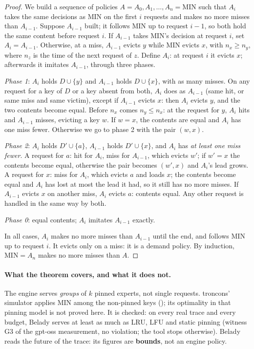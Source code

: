\begin{proof}
We build a sequence of policies $A = A_0, A_1, \ldots, A_n = \mathrm{MIN}$ such that $A_i$ takes the same decisions as MIN on the first $i$ requests and makes no more misses than $A_{i-1}$. Suppose $A_{i-1}$ built; it follows MIN up to request $i-1$, so both hold the same content before request $i$. If $A_{i-1}$ takes MIN's decision at request $i$, set $A_i = A_{i-1}$. Otherwise, at a miss, $A_{i-1}$ evicts $y$ while MIN evicts $x$, with $n_x \ge n_y$, where $n_z$ is the time of the next request of $z$. Define $A_i$: at request $i$ it evicts $x$; afterwards it imitates $A_{i-1}$, through three phases.

\emph{Phase 1}: $A_i$ holds $D \cup \{y\}$ and $A_{i-1}$ holds $D \cup \{x\}$, with as many misses. On any request for a key of $D$ or a key absent from both, $A_i$ does as $A_{i-1}$ (same hit, or same miss and same victim), except if $A_{i-1}$ evicts $x$: then $A_i$ evicts $y$, and the two contents become equal. Before $n_x$ comes $n_y \le n_x$: at the request for $y$, $A_i$ hits and $A_{i-1}$ misses, evicting a key $w$. If $w = x$, the contents are equal and $A_i$ has one miss fewer. Otherwise we go to phase 2 with the pair $(w, x)$.

\emph{Phase 2}: $A_i$ holds $D' \cup \{a\}$, $A_{i-1}$ holds $D' \cup \{x\}$, and $A_i$ has \emph{at least one miss fewer}. A request for $a$: hit for $A_i$, miss for $A_{i-1}$, which evicts $w'$; if $w' = x$ the contents become equal, otherwise the pair becomes $(w', x)$ and $A_i$'s lead grows. A request for $x$: miss for $A_i$, which evicts $a$ and loads $x$; the contents become equal and $A_i$ has lost at most the lead it had, so it still has no more misses. If $A_{i-1}$ evicts $x$ on another miss, $A_i$ evicts $a$: contents equal. Any other request is handled in the same way by both.

\emph{Phase 0}: equal contents; $A_i$ imitates $A_{i-1}$ exactly.

In all cases, $A_i$ makes no more misses than $A_{i-1}$ until the end, and follows MIN up to request $i$. It evicts only on a miss: it is a demand policy. By induction, $\mathrm{MIN} = A_n$ makes no more misses than $A$.
\end{proof}

\paragraph{What the theorem covers, and what it does not.} The engine serves \emph{groups} of $k$ pinned experts, not single requests. troncons' simulator applies MIN among the non-pinned keys (); its optimality in that pinning model is not proved here. It is checked: on every real trace and every budget, Belady serves at least as much as LRU, LFU and static pinning (witness G3 of the gpt-oss measurement, no violation; the tool stops otherwise). Belady reads the future of the trace: its figures are \textbf{bounds}, not an engine policy.

